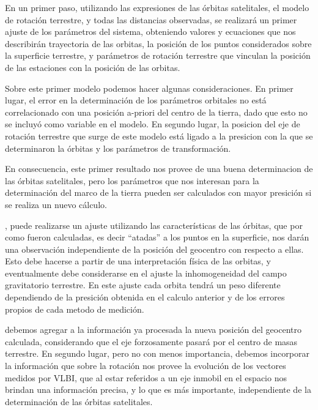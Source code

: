 \documentclass{tufte-book}
\begin{document}
En un primer paso, utilizando las expresiones de las órbitas satelitales, el modelo
de rotación terrestre, y todas las distancias observadas, se realizará un primer
ajuste de los parámetros del sistema, obteniendo valores y ecuaciones que nos
describirán trayectoria de las orbitas, la posición de los puntos considerados sobre
la superficie terrestre, y parámetros de rotación terrestre que vinculan la posición
de las estaciones con la posición de las orbitas.

Sobre este primer modelo podemos hacer algunas consideraciones. En primer lugar,
el error en la determinación de los parámetros orbitales no está correlacionado
con una posición a-priori del centro de la tierra, dado que esto no se incluyó
como variable en el modelo. En segundo lugar, la posicion del eje de rotación
terrestre que surge de este modelo está ligado a la presicion con la que se
determinaron la órbitas y los parámetros de transformación.

En consecuencia, este primer resultado nos provee de una buena determinacion
de las órbitas satelitales, pero los parámetros que nos interesan para la
determinación del marco de la tierra pueden ser calculados con mayor presición
si se realiza un nuevo cálculo.

, puede realizarse un ajuste
utilizando las características de las órbitas, que por como fueron calculadas, es
decir ``atadas'' a los puntos en la superficie, nos darán una observación
independiente de la posición del geocentro con respecto a ellas. Esto debe hacerse
a partir de una interpretación física de las orbitas, y eventualmente debe
considerarse en el ajuste la inhomogeneidad del campo gravitatorio terrestre.
En este ajuste cada orbita tendrá un peso diferente dependiendo de la presición
obtenida en el calculo anterior y de los errores propios de cada metodo de
medición.

 debemos
agregar a la información ya procesada la nueva posición del geocentro calculada,
considerando que el eje forzosamente pasará por el centro de masas terrestre.
En segundo lugar, pero no con menos importancia, debemos incorporar la información
que sobre la rotación nos provee la evolución de los vectores medidos por VLBI,
que al estar referidos a un eje inmobil en el espacio nos brindan una información
precisa, y lo que es más importante, independiente de la determinación de las
órbitas satelitales.
\end{document}
